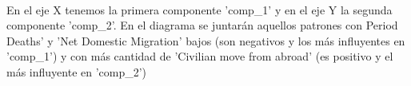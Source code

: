 \documentclass[11pt]{article}
\begin{document}
    \begin{center}
    \end{center}
    { \hspace*{\fill} \\}
    
    En el eje X tenemos la primera componente 'comp\_1' y en el eje Y la
segunda componente 'comp\_2'. En el diagrama se juntarán aquellos
patrones con Period Deaths' y 'Net Domestic Migration' bajos (son
negativos y los más influyentes en 'comp\_1') y con más cantidad de
'Civilian move from abroad' (es positivo y el más influyente en
'comp\_2')


    
    
    
    
\end{document}
